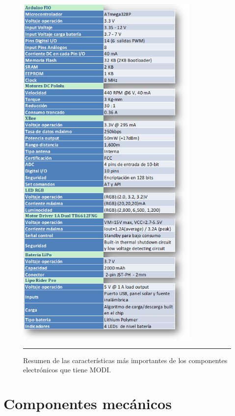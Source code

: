 \begin{figure}[htbp]
	\centering
		\includegraphics[width=0.8\textwidth]{./Figures/MODI/comparacionElo.png}
		\rule{35em}{0.5pt}
	\caption[Tabla ELO]{Resumen de las características más importantes de los componentes electrónicos que tiene MODI.}
	\label{fig:TablaElo}
\end{figure}


\section{Componentes mecánicos}

